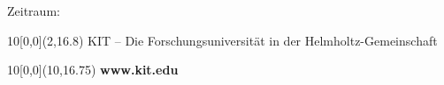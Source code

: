 \begin{titlepage}
    \vspace{2cm}
    \begin{center}
        \large{{Zeitraum}: \thesistimestart }
    \end{center}



    \begin{textblock}{10}[0,0](2,16.8)
        \tiny{KIT – Die Forschungsuniversität in der Helmholtz-Gemeinschaft}
    \end{textblock}
    \begin{textblock}{10}[0,0](10,16.75)
        \large{\textbf{www.kit.edu}}
    \end{textblock}
\end{titlepage}

